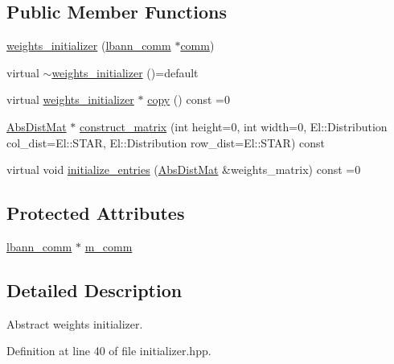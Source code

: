 \subsection*{Public Member Functions}
\begin{DoxyCompactItemize}
\item 
\hyperlink{classlbann_1_1weights__initializer_a3b65043cb6d76dcfcb07387392429755}{weights\+\_\+initializer} (\hyperlink{classlbann_1_1lbann__comm}{lbann\+\_\+comm} $\ast$\hyperlink{file__io_8cpp_ab048c6f9fcbcfaa57ce68b00263dbebe}{comm})
\item 
virtual \hyperlink{classlbann_1_1weights__initializer_a9fba102d897402d3df37776d8aa99549}{$\sim$weights\+\_\+initializer} ()=default
\item 
virtual \hyperlink{classlbann_1_1weights__initializer}{weights\+\_\+initializer} $\ast$ \hyperlink{classlbann_1_1weights__initializer_acc84ce49188b74b23987cef3db18525a}{copy} () const =0
\item 
\hyperlink{base_8hpp_a9a697a504ae84010e7439ffec862b470}{Abs\+Dist\+Mat} $\ast$ \hyperlink{classlbann_1_1weights__initializer_a693fd517e4162029eafdfdee537c7066}{construct\+\_\+matrix} (int height=0, int width=0, El\+::\+Distribution col\+\_\+dist=El\+::\+S\+T\+AR, El\+::\+Distribution row\+\_\+dist=El\+::\+S\+T\+AR) const
\item 
virtual void \hyperlink{classlbann_1_1weights__initializer_a2ad6acf904c0c7bc7406dbd9851107be}{initialize\+\_\+entries} (\hyperlink{base_8hpp_a9a697a504ae84010e7439ffec862b470}{Abs\+Dist\+Mat} \&weights\+\_\+matrix) const =0
\end{DoxyCompactItemize}
\subsection*{Protected Attributes}
\begin{DoxyCompactItemize}
\item 
\hyperlink{classlbann_1_1lbann__comm}{lbann\+\_\+comm} $\ast$ \hyperlink{classlbann_1_1weights__initializer_a4273257d92237a75ef9f3614f7e5ddde}{m\+\_\+comm}
\end{DoxyCompactItemize}


\subsection{Detailed Description}
Abstract weights initializer. 

Definition at line 40 of file initializer.\+hpp.



